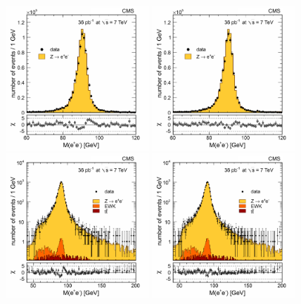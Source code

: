 \begin{figure}
  \begin{center}
   \includegraphics[width=0.48\textwidth]{figs/Zee_mass_Linear.pdf}
   \includegraphics[width=0.48\textwidth]{figs/Zee_mass_Linear_corrected.pdf}
   \includegraphics[width=0.48\textwidth]{figs/Zee_mass_Logarithmic.pdf}
   \includegraphics[width=0.48\textwidth]{figs/Zee_mass_Logarithmic_corrected.pdf}

\end{center}
\end{figure}
